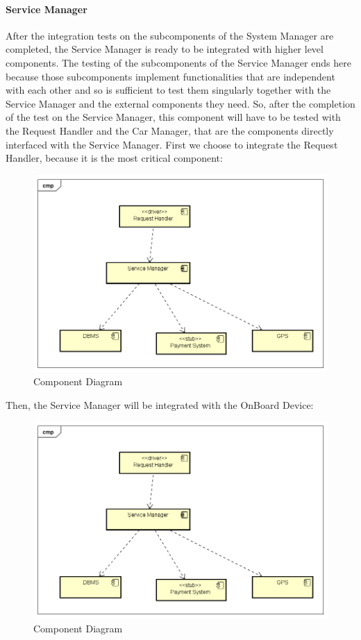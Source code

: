 \paragraph{Service Manager}
After the integration tests on the subcomponents of the System Manager are completed, the Service Manager is ready to be integrated with higher level components. The testing of the subcomponents of the Service Manager ends here because those subcomponents implement functionalities that are independent with each other and so is sufficient to test them singularly together with the Service Manager and the external components they need.
\newline
So, after the completion of the test on the Service Manager, this component will have to be tested with the Request Handler and the Car Manager, that are the components directly interfaced with the Service Manager.
First we choose to integrate the Request Handler, because it is the most critical component:


\begin{figure}[H]	
	\centering
	\includegraphics[width=\textwidth]{img/SrvMan_ReqHan_int}
	\caption{Component Diagram}
\end{figure}

Then, the Service Manager will be integrated with the OnBoard Device:


\begin{figure}[H]	
	\centering
	\includegraphics[width=\textwidth]{img/SrvMan_ReqHan_int}
	\caption{Component Diagram}
\end{figure}
